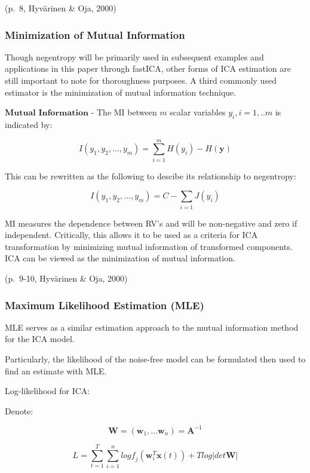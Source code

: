\documentclass[12pt,twoside]{amherstthesis}
\begin{document}
  (p.~8, Hyvärinen \& Oja, 2000)
  
  \subsubsection{Minimization of Mutual
  Information}\label{minimization-of-mutual-information}
  
  Though negentropy will be primarily used in subsequent examples and
  applications in this paper through fastICA, other forms of ICA
  estimation are still important to note for thoroughness purposes. A
  third commonly used estimator is the minimization of mutual information
  technique. \newline
  
  \(\textbf{Mutual Information}\) - The MI between \(\textit{m}\) scalar
  variables \(y_i,\textit{i} = 1,..m\) is indicated by:
  
  \[ I(y_1,y_2,...,y_\textit{m}) = \sum_{i=1}^m H(y_\textit{i})-H(\textbf{y})\]
  
  This can be rewritten as the following to descibe its relationship to
  negentropy:
  
  \[ I(y_1,y_2,...,y_\textit{m}) = C- \sum_{i=1} J(y_\textit{i})\]
  
  MI measures the dependence between RV's and will be non-negative and
  zero if independent. Critically, this allows it to be used as a criteria
  for ICA transformation by minimizing mutual information of transformed
  components. ICA can be viewed as the minimization of mutual information.
  
  (p.~9-10, Hyvärinen \& Oja, 2000)
  
  \subsubsection{Maximum Likelihood Estimation
  (MLE)}\label{maximum-likelihood-estimation-mle}
  
  MLE serves as a similar estimation approach to the mutual information
  method for the ICA model.
  
  Particularly, the likelihood of the noise-free model can be formulated
  then used to find an estimate with MLE.
  
  Log-likelihood for ICA:
  
  Denote:
  
  \[ \textbf{W} = (\textbf{w}_1,...\textbf{w}_n) = \textbf{A}^{-1} \]
  
  \[ L = \sum_{t=1}^T \sum_{i=1}^n log \textit{f}_j(\textbf{w}_\textit{i}^T  \textbf{x}(t))+\textit{T}log|det\textbf{W}|\]
  
\end{document}
